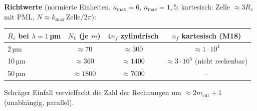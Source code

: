 \textbf{Richtwerte} (normierte Einheiten, $\kappa_{\max}=6$, $n_{\max}=1{,}5$; kartesisch: Zelle $\approx3R_s$ mit PML,
$N\approx k_{\max}\,\text{Zelle}/2\pi$):
\begin{center}
\small
\begin{tabular}{lccc}
\toprule
$R_s$ bei $\lambda=1\,$µm & $N_k$ (je $m$) & $4n_f$ zylindrisch & $n_f$ kartesisch (M18) \\
\midrule
2\,µm & $\approx70$ & $\approx300$ & $\approx1\cdot10^4$ \\
10\,µm & $\approx360$ & $\approx1400$ & $\approx3\cdot10^5$ (nicht rechenbar) \\
50\,µm & $\approx1800$ & $\approx7000$ & -- \\
\bottomrule
\end{tabular}
\end{center}
Schräger Einfall vervielfacht die Zahl der Rechnungen um $\approx2m_{\text{cut}}+1$ (unabhängig, parallel).

